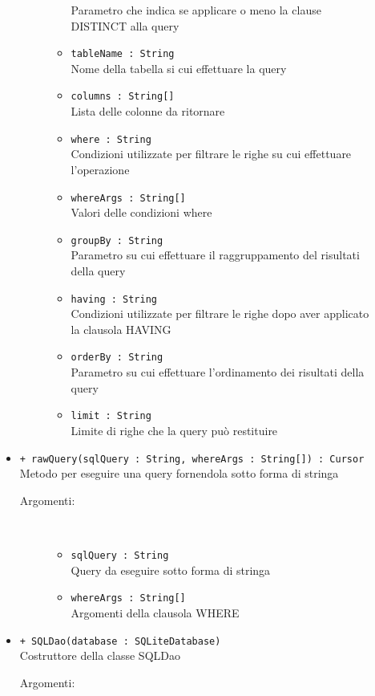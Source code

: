 \documentclass[../DefinizioneDiProdotto.tex]{subfiles}
\begin{document}
\begin{description}
\begin{itemize}
\begin{description}
\begin{itemize}
Parametro che indica se applicare o meno la clause DISTINCT alla query\item \texttt{tableName : String}\\
Nome della tabella si cui effettuare la query\item \texttt{columns : String[]}\\
Lista delle colonne da ritornare\item \texttt{where : String}\\
Condizioni utilizzate per filtrare le righe su cui effettuare l'operazione\item \texttt{whereArgs : String[]}\\
Valori delle condizioni where\item \texttt{groupBy : String}\\
Parametro su cui effettuare il raggruppamento del risultati della query\item \texttt{having : String}\\
Condizioni utilizzate per filtrare le righe dopo aver applicato la clausola HAVING\item \texttt{orderBy : String}\\
Parametro su cui effettuare l'ordinamento dei risultati della query\item \texttt{limit : String}\\
Limite di righe che la query può restituire\end{itemize}
\end{description}
\item \texttt{+ rawQuery(sqlQuery : String, whereArgs : String[]) : Cursor}\\
Metodo per eseguire una query fornendola sotto forma di stringa
 \begin{description}
\item[Argomenti:] \
\begin{itemize}
\item \texttt{sqlQuery : String}\\
Query da eseguire sotto forma di stringa\item \texttt{whereArgs : String[]}\\
Argomenti della clausola WHERE\end{itemize}
\end{description}
\item \texttt{+ SQLDao(database : SQLiteDatabase)}\\
Costruttore della classe SQLDao
 \begin{description}
\item[Argomenti:] \

\end{description}
\end{itemize}
\end{description}
\end{document}
